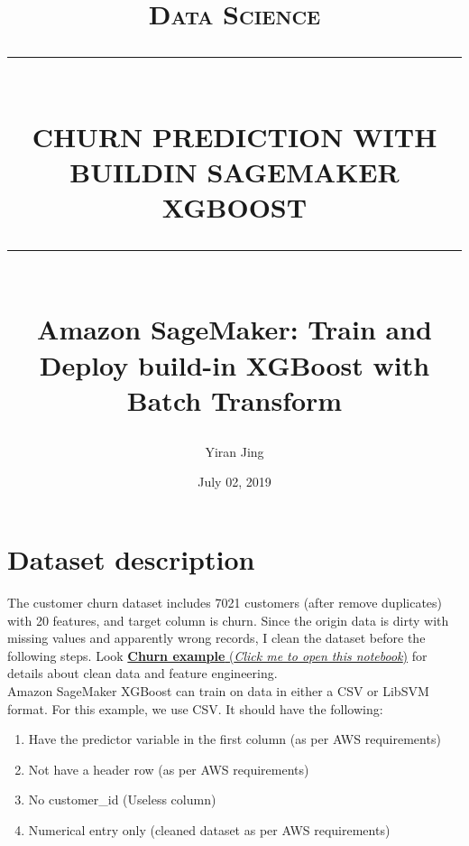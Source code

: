 \documentclass[12pt]{article}
\newcommand{\HRule}[1]{\rule{\linewidth}{#1}}
\begin{document}
\title{ \normalsize \textsc{Data Science}
		\\ [2.0cm]
		\HRule{0.5pt} \\
		\LARGE \textbf{\uppercase{Churn Prediction with buildin Sagemaker XGBoost}}
		\HRule{2pt} \\ [0.5cm]
		\small \textbf{Amazon SageMaker: Train and Deploy build-in XGBoost with Batch Transform}
		\normalsize \vspace*{5\baselineskip}}
		
\date{July 02, 2019}
\author{Yiran Jing\\}
\maketitle

\newpage
\thispagestyle{empty}


\newpage
\tableofcontents
\newpage
\setcounter{page}{1}
\section{Dataset description}

The customer churn dataset includes 7021 customers (after remove duplicates) with 20 features, and target column is churn. Since the origin data is dirty with missing values and apparently wrong records, I clean the dataset before the following steps. 
Look \href{https://github.com/YiranJing/BigDataAnalysis/blob/master/AWS_SageMaker_CustomerChurn/notebook/ChurnDataAnalysis/Churn_Example.ipynb}{\textbf{Churn example} (\textit{Click me to open this notebook})} for details about clean data and feature engineering.
\\

\noindent
Amazon SageMaker XGBoost can train on data in either a CSV or LibSVM format. For this example, we use CSV. It should have the following:
\begin{enumerate}
\item Have the predictor variable in the first column (as per AWS requirements)
\item Not have a header row (as per AWS requirements)
\item No customer\_id (Useless column)
\item Numerical entry only (cleaned dataset as per AWS requirements)

\end{enumerate}
\end{document}
